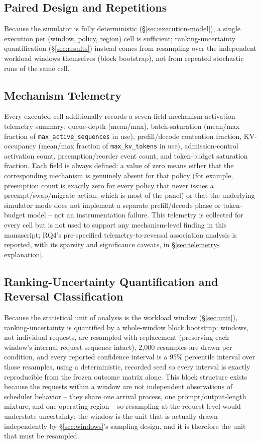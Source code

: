 \subsection{Paired Design and Repetitions}
\label{sec:paired}

Because the simulator is fully deterministic (\S\ref{sec:execution-model}),
a single execution per (window, policy, region) cell is sufficient;
ranking-uncertainty quantification (\S\ref{sec:results}) instead comes from
resampling over the independent workload windows themselves (block
bootstrap), not from repeated stochastic runs of the same cell.

\subsection{Mechanism Telemetry}
\label{sec:telemetry}

Every executed cell additionally records a seven-field mechanism-activation
telemetry summary: queue-depth (mean/max), batch-saturation (mean/max
fraction of \texttt{max\_active\_sequences} in use), prefill/decode
contention fraction, KV-occupancy (mean/max fraction of \texttt{max\_kv\_tokens}
in use), admission-control activation count, preemption/reorder event
count, and token-budget saturation fraction. Each field is always defined:
a value of zero means either that the corresponding mechanism is genuinely
absent for that policy (for example, preemption count is exactly zero for
every policy that never issues a preempt/swap/migrate action, which is most
of the panel) or that the underlying simulator mode does not implement a
separate prefill/decode phase or token-budget model -- not an
instrumentation failure. This telemetry is collected for every cell but is
not used to support any mechanism-level finding in this manuscript; RQ4's
pre-specified telemetry-to-reversal association analysis is reported, with
its sparsity and significance caveats, in \S\ref{sec:telemetry-explanation}.

\subsection{Ranking-Uncertainty Quantification and Reversal Classification}
\label{sec:uncertainty}

Because the statistical unit of analysis is the workload window
(\S\ref{sec:unit}), ranking-uncertainty is quantified by a whole-window
block bootstrap: windows, not individual requests, are resampled with
replacement (preserving each window's internal request sequence intact),
2{,}000 resamples are drawn per condition, and every reported confidence
interval is a 95\% percentile interval over those resamples, using a
deterministic, recorded seed so every interval is exactly reproducible from
the frozen outcome matrix alone. This block structure exists because the
requests within a window are not independent observations of scheduler
behavior -- they share one arrival process, one prompt/output-length
mixture, and one operating region -- so resampling at the request level
would understate uncertainty; the window is the unit that is actually
drawn independently by \S\ref{sec:windows}'s sampling design, and it is
therefore the unit that must be resampled.


